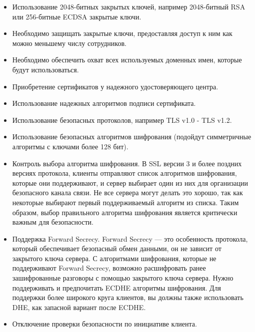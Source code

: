\documentclass[10pt,a4paper]{report}
\begin{document}
		\begin{itemize}
			\item Использование 2048-битных закрытых ключей, например 2048-битный RSA 
			или 256-битные ECDSA закрытые ключи.
			
			\item Необходимо защищать закрытые ключи, предоставляя доступ к ним как 
			можно меньшему числу сотрудников.
			
			\item Необходимо обеспечить охват всех используемых доменных имен, 
			которые будут использоваться.
			
			\item Приобретение сертификатов у надежного удостоверяющего центра.
			
			\item Использование надежных алгоритмов подписи сертификата.
			
			\item Использование безопасных протоколов, например TLS v1.0 - TLS v1.2.
			
			\item Использование безопасных алгоритмов шифрования (подойдут 
			симметричные алгоритмы с ключами более 128 бит).
			
			\item Контроль выбора алгоритма шифрования.
			В SSL версии 3 и более поздних версиях протокола, клиенты отправляют 
			список алгоритмов шифрования, которые они поддерживают, и сервер выбирает 
			один из них для организации безопасного канала связи.
			Не все сервера могут делать это хорошо, так как некоторые выбирают первый 
			поддерживаемый алгоритм из списка.
			Таким образом, выбор правильного алгоритма шифрования является критически 
			важным для безопасности.
			
			\item Поддержка Forward Secrecy.
			Forward Secrecy — это особенность протокола, который обеспечивает 
			безопасный обмен данными, он не зависит от закрытого ключа сервера.
			С алгоритмами шифрования, которые не поддерживают Forward Secrecy, 
			возможно расшифровать ранее зашифрованные разговоры с помощью закрытого 
			ключа сервера.
			Нужно поддерживать и предпочитать ECDHE алгоритмы шифрования.
			Для поддержки более широкого круга клиентов, вы должны также использовать 
			DHE, как запасной вариант после ECDHE.
			
			\item Отключение проверки безопасности по инициативе клиента.
		\end{itemize}
\end{document}
